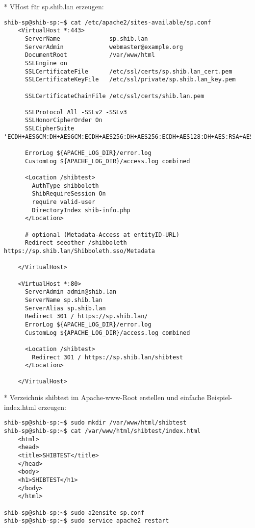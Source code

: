 * VHost für sp.shib.lan erzeugen:
\begin{lstlisting}
shib-sp@shib-sp:~$ cat /etc/apache2/sites-available/sp.conf
	<VirtualHost *:443>
	  ServerName              sp.shib.lan
	  ServerAdmin             webmaster@example.org
	  DocumentRoot            /var/www/html
	  SSLEngine on
	  SSLCertificateFile      /etc/ssl/certs/sp.shib.lan_cert.pem
	  SSLCertificateKeyFile   /etc/ssl/private/sp.shib.lan_key.pem

	  SSLCertificateChainFile /etc/ssl/certs/shib.lan.pem

	  SSLProtocol All -SSLv2 -SSLv3
	  SSLHonorCipherOrder On
	  SSLCipherSuite 'ECDH+AESGCM:DH+AESGCM:ECDH+AES256:DH+AES256:ECDH+AES128:DH+AES:RSA+AESGCM:RSA+AES:ECDH+3DES:DH+3DES:RSA+3DES:!aNULL:!eNULL:!LOW:!RC4:!MD5:!EXP:!PSK:!DSS:!SEED:!ECDSA:!CAMELLIA'

	  ErrorLog ${APACHE_LOG_DIR}/error.log
	  CustomLog ${APACHE_LOG_DIR}/access.log combined

	  <Location /shibtest>
		AuthType shibboleth
		ShibRequireSession On
		require valid-user
		DirectoryIndex shib-info.php
	  </Location>

	  # optional (Metadata-Access at entityID-URL)
	  Redirect seeother /shibboleth https://sp.shib.lan/Shibboleth.sso/Metadata

	</VirtualHost>

	<VirtualHost *:80>
	  ServerAdmin admin@shib.lan
	  ServerName sp.shib.lan
	  ServerAlias sp.shib.lan
	  Redirect 301 / https://sp.shib.lan/
	  ErrorLog ${APACHE_LOG_DIR}/error.log
	  CustomLog ${APACHE_LOG_DIR}/access.log combined

	  <Location /shibtest>
		Redirect 301 / https://sp.shib.lan/shibtest
	  </Location>

	</VirtualHost>
\end{lstlisting}
* Verzeichnis shibtest im Apache-www-Root erstellen und einfache
Beispiel-index.html erzeugen:
\begin{lstlisting}
shib-sp@shib-sp:~$ sudo mkdir /var/www/html/shibtest
shib-sp@shib-sp:~$ cat /var/www/html/shibtest/index.html
	<html>
	<head>
	<title>SHIBTEST</title>
	</head>
	<body>
	<h1>SHIBTEST</h1>
	</body>
	</html>

shib-sp@shib-sp:~$ sudo a2ensite sp.conf
shib-sp@shib-sp:~$ sudo service apache2 restart
\end{lstlisting}

